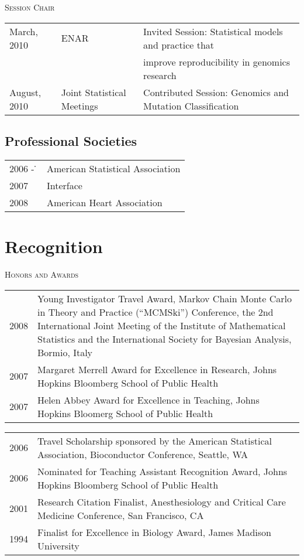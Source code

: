 \documentclass[11pt]{article}%
\begin{document}
{\noindent\textsc{Session Chair}\\
\begin{tabular}{lll}
  March, 2010 & ENAR & Invited Session: Statistical models and practice that\\
&& improve  reproducibility in genomics research\\
  August, 2010 & Joint Statistical Meetings & Contributed Session: Genomics and Mutation Classification\\
\end{tabular}

\subsection*{\sc Professional Societies}
\newcommand{\awardspace}{2pt}
\begin{tabular}{ll}
2006 - \. & American Statistical Association\\[\awardspace]
2007   & Interface\\[\awardspace]
2008   & American Heart Association\\[\awardspace]
\end{tabular}


\section*{\sc Recognition}

\noindent\textsc{Honors and Awards}

\begin{tabular}{lp{6in}}
  2008 & Young Investigator Travel Award, Markov Chain Monte Carlo in Theory and Practice (``MCMSki'') Conference, the 2nd International Joint Meeting of the Institute of Mathematical Statistics and the International Society for Bayesian Analysis, Bormio, Italy\\[\awardspace]
  2007 & Margaret Merrell Award for Excellence in Research, Johns Hopkins Bloomberg School of Public Health \\[\awardspace]
  2007 & Helen Abbey Award for Excellence in Teaching, Johns Hopkins
  Bloomerg School of Public Health%
\end{tabular}

\begin{tabular}{lp{6in}}
  2006 & Travel Scholarship sponsored by the American Statistical Association, Bioconductor Conference, Seattle, WA \\[\awardspace]
  2006 & Nominated for Teaching Assistant Recognition Award, Johns Hopkins Bloomberg School of Public Health \\[\awardspace]
  2001 & Research Citation Finalist, Anesthesiology and Critical Care Medicine Conference, San Francisco, CA\\  [\awardspace]
  1994 & Finalist for Excellence in Biology Award, James Madison University\\
\end{tabular}\\

}
\end{document}
